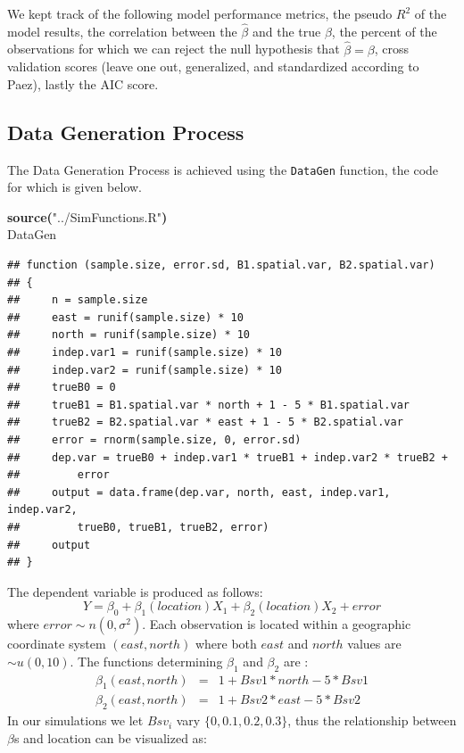 \documentclass{article}
\makeatletter
\newcommand{\hlfunctioncall}[1]{\textcolor[rgb]{0.501960784313725,0,0.329411764705882}{\textbf{#1}}}%
\newcommand{\hlstring}[1]{\textcolor[rgb]{0.6,0.6,1}{#1}}%
\newcommand{\hlkeyword}[1]{\textcolor[rgb]{0,0,0}{\textbf{#1}}}%
\newcommand{\hlsymbol}[1]{\textcolor[rgb]{0,0,0}{#1}}%
\newcommand{\hlstd}[1]{\textcolor[rgb]{0,0,0}{#1}}%
\newenvironment{kframe}{%
 \def\FrameCommand##1{\hskip\@totalleftmargin \hskip-\fboxsep
 \colorbox{shadecolor}{##1}\hskip-\fboxsep
     \hskip-\linewidth \hskip-\@totalleftmargin \hskip\columnwidth}%
 \MakeFramed {\advance\hsize-\width
   \@totalleftmargin\z@ \linewidth\hsize
   \@setminipage}}%
 {\par\unskip\endMakeFramed}
\newenvironment{knitrout}{}{} %
\makeatother
\begin{document}
We kept track of the following model performance metrics, the pseudo $R^2$ of the model results, the correlation between the $\hat{\beta}$ and the true $\beta$, the percent of the observations for which we can reject the null hypothesis that $\hat{\beta}=\beta$, cross validation scores (leave one out, generalized, and standardized according to Paez), lastly the AIC score.

\subsection{Data Generation Process}

The Data Generation Process is achieved using the \texttt{DataGen} function, the code for which is given below. 
\begin{knitrout}
\color{fgcolor}\begin{kframe}
\begin{flushleft}
\ttfamily\noindent
\hlfunctioncall{source}\hlkeyword{(}\hlstring{"{}../SimFunctions.R"{}}\hlkeyword{)}\hspace*{\fill}\\
\hlstd{}\hlsymbol{DataGen}\mbox{}
\normalfont
\end{flushleft}
\begin{verbatim}
## function (sample.size, error.sd, B1.spatial.var, B2.spatial.var) 
## {
##     n = sample.size
##     east = runif(sample.size) * 10
##     north = runif(sample.size) * 10
##     indep.var1 = runif(sample.size) * 10
##     indep.var2 = runif(sample.size) * 10
##     trueB0 = 0
##     trueB1 = B1.spatial.var * north + 1 - 5 * B1.spatial.var
##     trueB2 = B2.spatial.var * east + 1 - 5 * B2.spatial.var
##     error = rnorm(sample.size, 0, error.sd)
##     dep.var = trueB0 + indep.var1 * trueB1 + indep.var2 * trueB2 + 
##         error
##     output = data.frame(dep.var, north, east, indep.var1, indep.var2, 
##         trueB0, trueB1, trueB2, error)
##     output
## }
\end{verbatim}
\end{kframe}
\end{knitrout}


The dependent variable is produced as follows:
\begin{equation}
Y = \beta _0 + \beta _1(location) X_1 + \beta _2(location) X_2 + error
\end{equation}
where $error \sim n(0, \sigma ^2)$. Each observation is located within a geographic coordinate system $(east, north)$ where both $east$ and $north$ values are $\sim u(0, 10)$. The functions determining $\beta _1$ and $\beta _2$ are :
\begin{eqnarray}
\beta _1 (east, north) &=& 1 + Bsv1 * north - 5*Bsv1 \\
\beta _2 (east, north) &=& 1 + Bsv2 * east - 5*Bsv2
\end{eqnarray}
In our simulations we let $Bsv_i$ vary $\{0, 0.1, 0.2, 0.3\}$, thus the relationship between $\beta$s and location can be visualized as:
\end{document}
